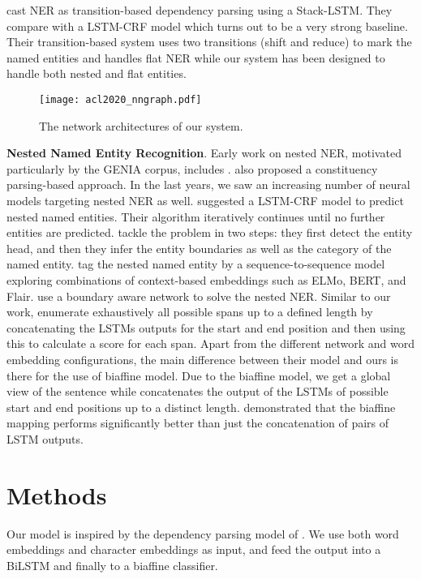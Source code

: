 \documentclass[11pt,a4paper]{article}
\begin{document}
 cast NER as transition-based dependency parsing using a Stack-LSTM. They compare with a LSTM-CRF model which turns out to be a very strong baseline. Their transition-based system uses two transitions (shift and reduce) to mark the named entities and handles flat NER while our system has been designed to handle both nested and flat entities. 

\begin{figure}[t]
    \centering
    \texttt{[image: acl2020\_nngraph.pdf]}
    \caption{The network architectures of our system.}
    \label{fig:nngraph}
\end{figure}

\textbf{Nested Named Entity Recognition}. 
Early work on nested NER, motivated particularly by the GENIA corpus, includes \cite{shen-et-al:BIONLP03,alex-et-al:BIONLP07,finkel-manning-2009-nested}. 
 also proposed a constituency parsing-based approach.
In the last years, we saw an increasing number of neural models targeting nested NER as well. 
 suggested a LSTM-CRF model to predict nested named entities. Their algorithm iteratively continues until no further entities are predicted.  tackle the problem in two steps: they first detect the entity head, and then they infer the entity boundaries as well as the category of the named entity. 
 tag the nested named entity by a sequence-to-sequence model exploring combinations of context-based embeddings such as ELMo, BERT, and Flair.   use a boundary aware network to solve the nested NER. Similar to our work,  enumerate exhaustively all possible spans up to a defined length by concatenating the LSTMs outputs for the start and end position and then using this to calculate a score for each span. Apart from the different network and word embedding configurations, the main difference between their model and ours is there for the use of biaffine model. Due to the biaffine model, we get a global view of the sentence while  concatenates the output of the LSTMs of possible start and end positions up to a distinct length.  demonstrated that the biaffine mapping performs significantly better than just the concatenation of pairs of LSTM outputs.


\section{Methods}
Our model is inspired by the dependency parsing model of . 
We use both word embeddings and character embeddings as input, 
and feed the output into a BiLSTM and finally to a biaffine classifier. 
\end{document}
